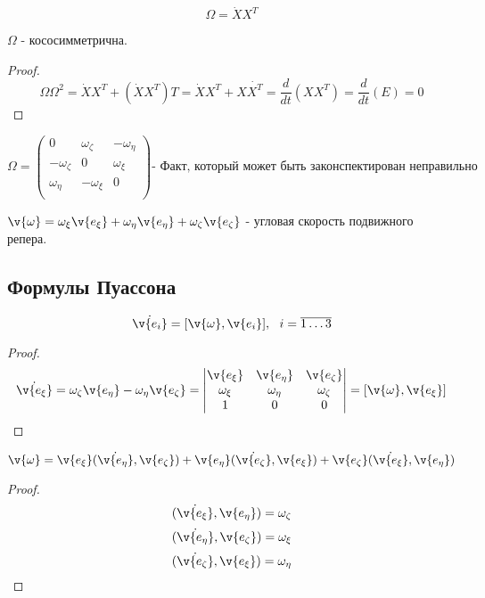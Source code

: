   $$ \Omega = \dot X X^T $$

  
  \begin{ass}
  $\Omega$ - кососимметрична.
  \end{ass}
  \begin{proof}
  $$ \Omega \Omega^2 = \dot X X^T + (\dot X X^T)T = \dot X X^T + X \dot {X^T} = \frac{d}{dt}(XX^T) = 
  \frac{d}{dt}(E) = 0 $$
  \end{proof}
  
  \begin{cor}
  $$ \Omega =
  \left(
  \begin{matrix}
  0 & \omega_{\zeta} & -\omega_{\eta} \\
  -\omega_{\zeta} & 0 & \omega_{\xi} \\
  \omega_{\eta} & -\omega_{\xi} & 0 \\
  \end{matrix}
  \right)
  \text{- Факт, который может быть законспектирован неправильно}
  $$
  \end{cor}
  
  \begin{df}
  $ \v{\omega} = \omega_{\xi}\v{e_{\xi}} + \omega_{\eta}\v{e_{\eta}} + \omega_{\zeta}\v{e_{\zeta}} $ - угловая скорость подвижного репера.
  \end{df}
  
  \subsection{Формулы Пуассона}
  \begin{ass}
  $$ \dot{\v{e_i}} = [\v{\omega}, \v{e_i}],~~ i = \overline{1 \ldots 3} $$
  \end{ass}
  \begin{proof}
  $$
  \dot{\v{e_{\xi}}} = \omega_{\zeta} \v{e_{\eta}} - \omega_{\eta} \v{e_{\zeta}} =
  \begin{vmatrix}
  \v{e_{\xi}} & \v{e_{\eta}} & \v{e_{\zeta}} \\
  \omega_{\xi} & \omega_{\eta} & \omega_{\zeta} \\
  1 & 0 & 0 \\ 
  \end{vmatrix}
  =
  [\v{\omega}, \v{e_{\xi}}] 
  $$
  \end{proof}
  
  \begin{ass}
  $ \v{\omega} = \v{e_{\xi}}(\dot{\v{e_{\eta}}}, \v{e_{\zeta}}) + \v{e_{\eta}}(\dot{\v{e_{\zeta}}}, \v{e_{\xi}}) + \v{e_{\zeta}}(\dot{\v{e_{\xi}}}, \v{e_{\eta}}) $
  \end{ass}
  \begin{proof}
  $$ (\dot{\v{e_{\xi}}}, \v{e_{\eta}}) = \omega_{\zeta} $$
  $$ (\dot{\v{e_{\eta}}}, \v{e_{\zeta}}) = \omega_{\xi} $$
  $$ (\dot{\v{e_{\zeta}}}, \v{e_{\xi}}) = \omega_{\eta} $$
  \end{proof}
  
